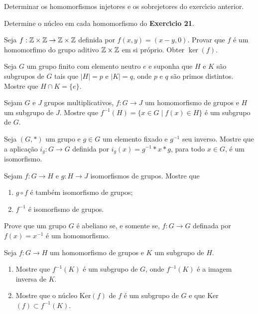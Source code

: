 \documentclass[12pt]{article}
\begin{document}
\vesp

\questao{} Determinar os homomorfismos injetores e os sobrejetores do exerc{\'\i}cio anterior.

\vesp

\questao{} Determine o n\'ucleo em cada homomorfismo do \textbf{Exerc{\'\i}cio 21}.

\vesp

\questao{} Seja $f: \mathbb{Z} \times \mathbb{Z} \to \mathbb{Z} \times \mathbb{Z}$ definida por $f(x, y) = (x - y, 0)$. Provar que $f$ \'e um homomorfimo do grupo aditivo $\mathbb{Z} \times \mathbb{Z}$ em si pr\'oprio. Obter $\ker(f)$.

\vesp

\questao{} Seja $G$ um grupo finito com elemento
neutro $e$ e suponha que $H$ e $K$ s{\~a}o subgrupos de $G$ tais que
$|H|=p$ e $|K|=q$, onde $p$ e $q$ s{\~a}o primos distintos. Mostre que
$H\cap K=\{e\}$.

\vesp

\questao{} Sejam $G$ e $J$ grupos multiplicativos, $f : G \to J$ um homomorfismo de grupos e $H$ um subgrupo de $J$. Mostre que $f^{-1}(H) = \{ x \in G \mid f(x) \in H\}$ {\'e} um subgrupo de $G$.

\vesp

\questao{} Seja $(G, *)$ um grupo e $g\in G$ um elemento fixado e $g^{-1}$
seu inverso. Mostre que a aplica{\c c}{\~a}o $i_g: G\to G$ definida por
$i_g(x)=g^{-1}*x*g$, para todo $x \in G$, {\'e} um isomorfismo.

\vesp

\questao{} Sejam $f:G\to H$ e $g:H\to J$ isomorfismos de grupos. Mostre
que
\begin{enumerate}[label=({\alph*})]
\item $g\circ f$ {\'e} tamb{\'e}m isomorfismo de grupos;
\item $f^{-1}$ {\'e} isomorfismo de grupos.
\end{enumerate}

\vesp


\questao{} Prove que um grupo $G$ {\'e} abeliano se, e somente se, $f : G \to G$ definada por $f(x) = x^{-1}$ {\'e} um homomorfismo.

\vesp

\questao{} Seja $f: G\to H$ um
homomorfismo de grupos e $K$ um subgrupo de $H$.
\begin{enumerate}[label=({\alph*})]
\item Mostre que $f^{-1}(K)$ {\'e} um subgrupo de $G$, onde $f^{-1}(K)$ {\'e} a imagem inversa de $K$.
\item Mostre que o n{\'u}cleo Ker$(f)$ de $f$ {\'e} um subgrupo de
$G$  e que Ker$(f)\subset f^{-1}(K)$.
\end{enumerate}


\end{document}
